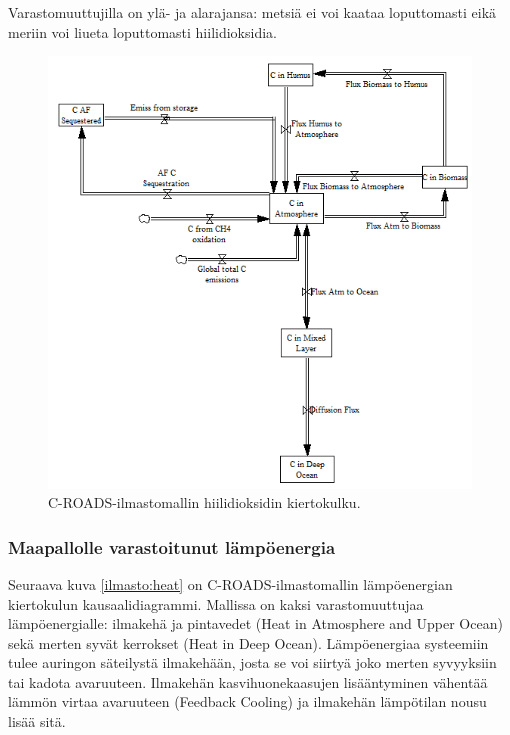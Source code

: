\documentclass[finnish,12pt,a4paper,pdftex]{article}
\begin{document}
\begin{onehalfspacing}
Varastomuuttujilla on ylä- ja alarajansa: metsiä ei voi kaataa loputtomasti eikä meriin voi liueta loputtomasti hiilidioksidia. 

\begin{figure}[H]
\centering \includegraphics{c-roads-co2}
\caption{C-ROADS-ilmastomallin hiilidioksidin kiertokulku. \cite{Croads} \label{ilmasto:co2}}
\end{figure}

\clearpage

\subsubsection{Maapallolle varastoitunut lämpöenergia \label{ilmasto:croads:lampo}}

Seuraava kuva \ref{ilmasto:heat} on C-ROADS-ilmastomallin lämpöenergian kiertokulun kausaalidiagrammi. Mallissa on kaksi varastomuuttujaa lämpöenergialle: ilmakehä ja pintavedet (Heat in Atmosphere and Upper Ocean) sekä merten syvät kerrokset (Heat in Deep Ocean). Lämpöenergiaa systeemiin tulee auringon säteilystä ilmakehään, josta se voi siirtyä joko merten syvyyksiin tai kadota avaruuteen. Ilmakehän kasvihuonekaasujen lisääntyminen vähentää lämmön virtaa avaruuteen (Feedback Cooling) ja ilmakehän lämpötilan nousu lisää sitä. 


\end{onehalfspacing}
\end{document}
